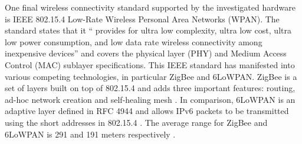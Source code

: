       One final wireless connectivity standard supported by the investigated hardware is IEEE 802.15.4 Low-Rate Wireless Personal Area Networks (WPAN). The standard states that it `` provides for ultra low complexity, ultra low cost, ultra low power consumption, and low data rate wireless connectivity among inexpensive devices'' and covers the physical layer (PHY) and Medium Access Control (MAC) sublayer specifications. This IEEE standard has manifested into various competing technologies, in particular ZigBee and 6LoWPAN. ZigBee is a set of layers built on top of 802.15.4 and adds three important features: routing, ad-hoc network creation and self-healing mesh \citep{buildingWSN:2010}. In comparison, 6LoWPAN is an adaptive layer defined in RFC 4944 and allows IPv6 packets to be transmitted using the short addresses in 802.15.4 \citep{IPisDead:2008}. The average range for ZigBee and 6LoWPAN is 291 and 191 meters respectively \citep{linklabs:2015}.

